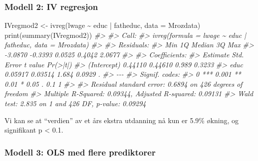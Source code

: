 \documentclass[
]{article}
\newenvironment{Shaded}{\begin{snugshade}}{\end{snugshade}}
\newcommand{\AttributeTok}[1]{\textcolor[rgb]{0.77,0.63,0.00}{#1}}
\newcommand{\CommentTok}[1]{\textcolor[rgb]{0.56,0.35,0.01}{\textit{#1}}}
\newcommand{\FunctionTok}[1]{\textcolor[rgb]{0.00,0.00,0.00}{#1}}
\newcommand{\NormalTok}[1]{#1}
\newcommand{\OtherTok}[1]{\textcolor[rgb]{0.56,0.35,0.01}{#1}}
\newcommand{\SpecialCharTok}[1]{\textcolor[rgb]{0.00,0.00,0.00}{#1}}
\begin{document}
\hypertarget{modell-2-iv-regresjon}{%
\subsubsection{Modell 2: IV regresjon}\label{modell-2-iv-regresjon}}

\begin{Shaded}
\begin{Highlighting}[]
\NormalTok{IVregmod2 }\OtherTok{\textless{}{-}} \FunctionTok{ivreg}\NormalTok{(lwage }\SpecialCharTok{\textasciitilde{}}\NormalTok{ educ }\SpecialCharTok{|}\NormalTok{ fatheduc, }\AttributeTok{data =}\NormalTok{ Mrozdata)}
\FunctionTok{print}\NormalTok{(}\FunctionTok{summary}\NormalTok{(IVregmod2))}
\CommentTok{\#\textgreater{} }
\CommentTok{\#\textgreater{} Call:}
\CommentTok{\#\textgreater{} ivreg(formula = lwage \textasciitilde{} educ | fatheduc, data = Mrozdata)}
\CommentTok{\#\textgreater{} }
\CommentTok{\#\textgreater{} Residuals:}
\CommentTok{\#\textgreater{}     Min      1Q  Median      3Q     Max }
\CommentTok{\#\textgreater{} {-}3.0870 {-}0.3393  0.0525  0.4042  2.0677 }
\CommentTok{\#\textgreater{} }
\CommentTok{\#\textgreater{} Coefficients:}
\CommentTok{\#\textgreater{}             Estimate Std. Error t value Pr(\textgreater{}|t|)  }
\CommentTok{\#\textgreater{} (Intercept)  0.44110    0.44610   0.989   0.3233  }
\CommentTok{\#\textgreater{} educ         0.05917    0.03514   1.684   0.0929 .}
\CommentTok{\#\textgreater{} {-}{-}{-}}
\CommentTok{\#\textgreater{} Signif. codes:  }
\CommentTok{\#\textgreater{} 0 \textquotesingle{}***\textquotesingle{} 0.001 \textquotesingle{}**\textquotesingle{} 0.01 \textquotesingle{}*\textquotesingle{} 0.05 \textquotesingle{}.\textquotesingle{} 0.1 \textquotesingle{} \textquotesingle{} 1}
\CommentTok{\#\textgreater{} }
\CommentTok{\#\textgreater{} Residual standard error: 0.6894 on 426 degrees of freedom}
\CommentTok{\#\textgreater{} Multiple R{-}Squared: 0.09344, Adjusted R{-}squared: 0.09131 }
\CommentTok{\#\textgreater{} Wald test: 2.835 on 1 and 426 DF,  p{-}value: 0.09294}
\end{Highlighting}
\end{Shaded}

Vi kan se at ``verdien'' av et års ekstra utdanning nå kun er 5.9\% økning, og signifikant p \textless{} 0.1.

\hypertarget{modell-3-ols-med-flere-prediktorer}{%
\subsubsection{Modell 3: OLS med flere prediktorer}\label{modell-3-ols-med-flere-prediktorer}}
\end{document}
